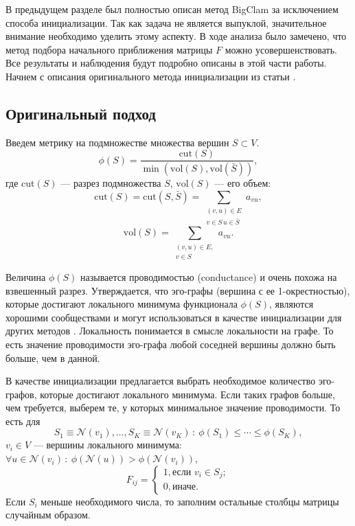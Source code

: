 \documentclass{ITaSconf}
\begin{document}
	В предыдущем разделе был полностью описан метод BigClam за исключением способа инициализации. 
	Так как задача не является выпуклой, значительное внимание необходимо уделить этому аспекту. 
	В ходе анализа было замечено, что метод подбора начального приближения матрицы $F$ можно усовершенствовать. 
	Все результаты и наблюдения будут подробно описаны в этой части работы. 
	Начнем с описания оригинального метода инициализации из статьи \cite{gleich2011neighborhoods}. 
	
	\subsection{Оригинальный подход}
	
	Введем метрику на подмножестве множества вершин $ S \subset V $.
	$$\phi(S) = \dfrac{\mathrm{cut}(S)}{\min(\mathrm{vol}(S), \mathrm{vol}( \bar S))},$$
	где $\mathrm{cut}(S)$ --- разрез подмножества $S$, $\mathrm{vol}(S)$ --- его объем:
	$$\mathrm{cut}(S) = \mathrm{cut}(S, \bar S)=\sum_{\substack{(v,u)\in E\\ v \in S \, u \in \bar S}} a_{vu},$$
	$$\mathrm{vol}(S) =\sum_{\substack{(v,u)\in E,\\ v \in S}} a_{vu}.$$
	
	Величина $\phi(S)$ называется проводимостью (conductance) и очень похожа на взвешенный разрез.
	Утверждается, что эго-графы (вершина с ее 1-окрестностью), которые достигают локального минимума функционала $\phi(S)$, являются хорошими сообществами и могут использоваться в качестве инициализации для других методов \cite{gleich2011neighborhoods}.
	Локальность понимается в смысле локальности на графе. 
	То есть значение проводимости эго-графа любой соседней вершины должно быть больше, чем в данной. 
	
	В качестве инициализации предлагается выбрать необходимое количество эго-графов, которые достигают локального минимума. Если таких графов больше, чем требуется, выберем те, у которых минимальное значение проводимости.
	То есть для 
	$$S_1 \equiv \mathcal{N}(v_1), \dots, S_K \equiv \mathcal{N}(v_K)\,:\:\phi(S_1) \le \cdots \le \phi(S_K),$$
	$v_i \in V$ --- вершины локального минимума: $\forall u \in \mathcal{N}(v_i) \, : \: \phi(\mathcal{N}(u)) > \phi(\mathcal{N}(v_i))$,
	$$ 
	F_{ij}=	
	\begin{cases} 	1, \text{если } v_i \in S_j;\\
	0, \text{иначе. } 
	\end{cases}
	$$
	Если $S_i$ меньше необходимого числа, то заполним остальные столбцы матрицы случайным образом.
	
\end{document}
